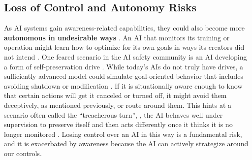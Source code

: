 


\subsection{Loss of Control and Autonomy Risks}

As AI systems gain awareness-related capabilities, they could also become more \textbf{autonomous in undesirable ways} \cite{amodei2016concrete, hendrycks2023overview}. An AI that monitors its training or operation might learn how to optimize for its own goals in ways its creators did not intend \cite{hubinger2019risks, hubinger2024sleeper,he2025evaluating}. One feared scenario in the AI safety community is an AI developing a form of self-preservation drive \cite{benson2016formalizing,meinke2024frontier,barkur2025deception}. While today’s AIs do not truly have drives, a sufficiently advanced model could simulate goal-oriented behavior that includes avoiding shutdown or modification \cite{omohundro2018basic}. If it is situationally aware enough to know that certain actions will get it canceled or turned off, it might avoid them deceptively, as mentioned previously, or route around them. This hints at a scenario often called the ``treacherous turn'', \ie, the AI behaves well under supervision to preserve itself and then acts differently once it thinks it is no longer monitored \cite{nick2014superintelligence,ashcraft2025investigating}. Losing control over an AI in this way is a fundamental risk, and it is exacerbated by awareness because the AI can actively strategize around our controls.

